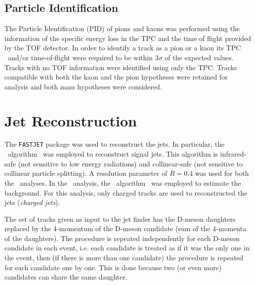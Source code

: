 \subsection{Particle Identification}

The Particle Identification (PID) of pions and kaons was performed using the information of the specific energy loss 
in the TPC and the time of flight provided by the TOF detector. 
In order to identify a track as a pion or a kaon its TPC \dedx\ and/or time-of-flight were required to be within 3$\sigma$ of the expected values. 
Tracks with no TOF information were identified using only the TPC.
Tracks compatible with both the kaon and the pion hypotheses were retained for analysis and both mass hypotheses were considered.


\section{Jet Reconstruction}

The \texttt{FASTJET}\cite{Cacciari:2012} package was used to reconstruct the jets. 
In particular, the \antikt\ algorithm~\cite{Cacciari:2008c} was employed to reconstruct signal jets. 
This algorithm is infrared-safe (not sensitive to low energy radiations) and collinear-safe (not sensitive to collinear particle splitting).
A resolution parameter of $R=0.4$ was used for both the \pPb\ analyses.
In the \pPb\ analysis, the \kt\ algorithm~\cite{Cacciari:2006} was employed to estimate the background. 
For this analysis, only charged tracks are used to reconstructed the jets (\emph{charged jets}).

The set of tracks given as input to the jet finder has the D-meson daughters replaced 
by the 4-momentum of the D-meson candidate (sum of the 4-momenta of the daughters).
The procedure is repeated independently for each D-meson candidate in each event, 
i.e. each candidate is treated as if it was the only one in the event, then (if there is more than one candidate) the procedure
is repeated for each candidate one by one.
This is done because two (or even more) candidates can share the same daughter. 

